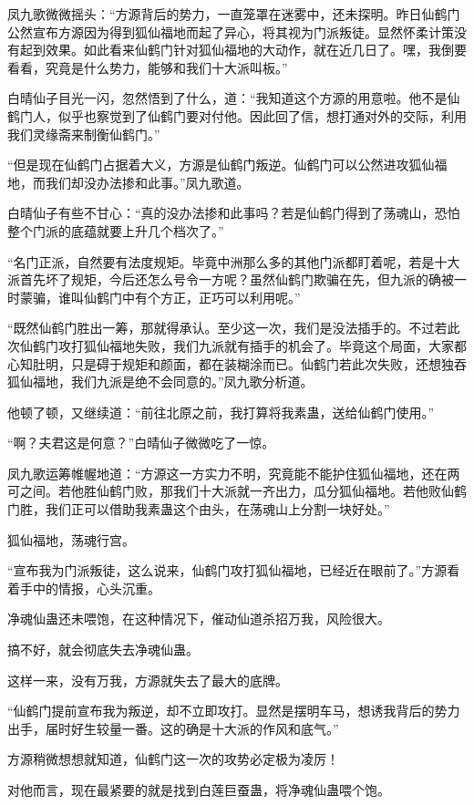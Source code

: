 \begin{this_body}
凤九歌微微摇头：“方源背后的势力，一直笼罩在迷雾中，还未探明。昨日仙鹤门公然宣布方源因为得到狐仙福地而起了异心，将其视为门派叛徒。显然怀柔计策没有起到效果。如此看来仙鹤门针对狐仙福地的大动作，就在近几日了。嘿，我倒要看看，究竟是什么势力，能够和我们十大派叫板。”

白晴仙子目光一闪，忽然悟到了什么，道：“我知道这个方源的用意啦。他不是仙鹤门人，似乎也察觉到了仙鹤门要对付他。因此回了信，想打通对外的交际，利用我们灵缘斋来制衡仙鹤门。”

“但是现在仙鹤门占据着大义，方源是仙鹤门叛逆。仙鹤门可以公然进攻狐仙福地，而我们却没办法掺和此事。”凤九歌道。

白晴仙子有些不甘心：“真的没办法掺和此事吗？若是仙鹤门得到了荡魂山，恐怕整个门派的底蕴就要上升几个档次了。”

“名门正派，自然要有法度规矩。毕竟中洲那么多的其他门派都盯着呢，若是十大派首先坏了规矩，今后还怎么号令一方呢？虽然仙鹤门欺骗在先，但九派的确被一时蒙骗，谁叫仙鹤门中有个方正，正巧可以利用呢。”

“既然仙鹤门胜出一筹，那就得承认。至少这一次，我们是没法插手的。不过若此次仙鹤门攻打狐仙福地失败，我们九派就有插手的机会了。毕竟这个局面，大家都心知肚明，只是碍于规矩和颜面，都在装糊涂而已。仙鹤门若此次失败，还想独吞狐仙福地，我们九派是绝不会同意的。”凤九歌分析道。

他顿了顿，又继续道：“前往北原之前，我打算将我素蛊，送给仙鹤门使用。”

“啊？夫君这是何意？”白晴仙子微微吃了一惊。

凤九歌运筹帷幄地道：“方源这一方实力不明，究竟能不能护住狐仙福地，还在两可之间。若他胜仙鹤门败，那我们十大派就一齐出力，瓜分狐仙福地。若他败仙鹤门胜，我们正可以借助我素蛊这个由头，在荡魂山上分割一块好处。”

狐仙福地，荡魂行宫。

“宣布我为门派叛徒，这么说来，仙鹤门攻打狐仙福地，已经近在眼前了。”方源看着手中的情报，心头沉重。

净魂仙蛊还未喂饱，在这种情况下，催动仙道杀招万我，风险很大。

搞不好，就会彻底失去净魂仙蛊。

这样一来，没有万我，方源就失去了最大的底牌。

“仙鹤门提前宣布我为叛逆，却不立即攻打。显然是摆明车马，想诱我背后的势力出手，届时好生较量一番。这的确是十大派的作风和底气。”

方源稍微想想就知道，仙鹤门这一次的攻势必定极为凌厉！

对他而言，现在最紧要的就是找到白莲巨蚕蛊，将净魂仙蛊喂个饱。


\end{this_body}
